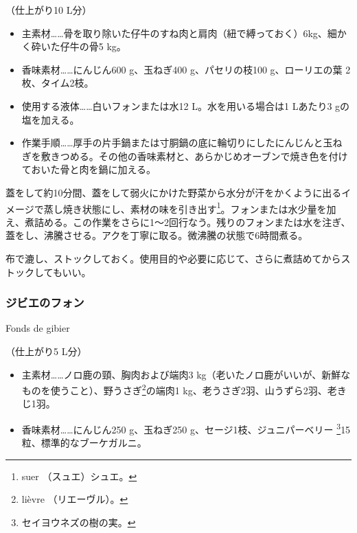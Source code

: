 \begin{recette}
（仕上がり10 L分）

\begin{itemize}
\item
  主素材\ldots{}\ldots{}骨を取り除いた仔牛のすね肉と肩肉（紐で縛っておく）6kg、細かく砕いた仔牛の骨5
  kg。
\item
  香味素材\ldots{}\ldots{}にんじん600 g、玉ねぎ400 g、パセリの枝100
  g、ローリエの葉 2枚、タイム2枝。
\item
  使用する液体\ldots{}\ldots{}白いフォンまたは水12 L。水を用いる場合は1
  Lあたり3 gの塩を加える。
\item
  作業手順\ldots{}\ldots{}厚手の片手鍋または寸胴鍋の底に輪切りにしたにんじんと玉ねぎを敷きつめる。その他の香味素材と、あらかじめオーブンで焼き色を付けておいた骨と肉を鍋に加える。
\end{itemize}

蓋をして約10分間、蓋をして弱火にかけた野菜から水分が汗をかくように出るイメージで蒸し焼き状態にし、素材の味を引き出す\footnote{suer
  （スュエ）シュエ。}。フォンまたは水少量を加え、煮詰める。この作業をさらに1〜2回行なう。残りのフォンまたは水を注ぎ、蓋をし、沸騰させる。アクを丁寧に取る。微沸騰の状態で6時間煮る。

布で漉し、ストックしておく。使用目的や必要に応じて、さらに煮詰めてからストックしてもいい。

\atoaki{}

\hypertarget{fonds-de-gibier}{%
\subsubsection{ジビエのフォン}\label{fonds-de-gibier}}

\begin{frsubenv}

Fonds de gibier

\end{frsubenv}

 

（仕上がり5 L分）

\begin{itemize}
\item
  主素材\ldots{}\ldots{}ノロ鹿の頸、胸肉および端肉3
  kg（老いたノロ鹿がいいが、新鮮なものを使うこと）、野うさぎ\footnote{lièvre
    （リエーヴル）。}の端肉1 kg、老うさぎ2羽、山うずら2羽、老きじ1羽。
\item
  香味素材\ldots{}\ldots{}にんじん250 g、玉ねぎ250
  g、セージ1枝、ジュニパーベリー \footnote{セイヨウネズの樹の実。}15粒、標準的なブーケガルニ。
\end{itemize}


\end{recette}
